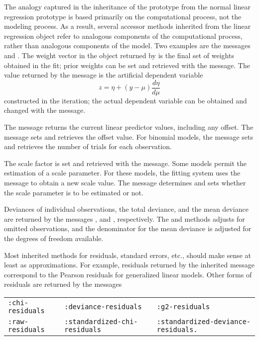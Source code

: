 The analogy captured in the inheritance of the 
prototype from the normal linear regression prototype is based
primarily on the computational process, not the modeling process. As a
result, several accessor methods inherited from the linear regression
object refer to analogous components of the computational process,
rather than analogous components of the model. Two examples are the
messages  and . The weight vector in the
object returned by  is the final set of weights
obtained in the fit; prior weights can be set and retrieved with the
 message. The value returned by the 
message is the artificial dependent variable
\begin{displaymath}
z = \eta + (y - \mu) \frac{d\eta}{d\mu}
\end{displaymath}
constructed in the iteration; the actual dependent variable can be
obtained and changed with the  message.

The message  returns the current linear predictor values,
including any offset. The  message sets and retrieves
the offset value. For binomial models, the  message
sets and retrieves the number of trials for each observation.

The scale factor is set and retrieved with the  message.
Some models permit the estimation of a scale parameter. For these
models, the fitting system uses the  message to
obtain a new scale value. The message 
determines and sets whether the scale parameter is to be estimated or
not.

Deviances of individual observations, the total deviance, and the mean
deviance are returned by the messages ,
 and , respectively. The
 and  methods adjusts for
omitted observations, and the denominator for the mean deviance is
adjusted for the degrees of freedom available.

Most inherited methods for residuals, standard errors, etc., should
make sense at least as approximations. For example, residuals returned
by the inherited  message correspond to the Pearson
residuals for generalized linear models. Other forms of residuals are
returned by the messages
\begin{center}
\begin{tabular}{lll}
\tt :chi-residuals & \tt :deviance-residuals & \tt :g2-residuals\\
\tt :raw-residuals & \tt :standardized-chi-residuals & \tt :standardized-deviance-residuals.
\end{tabular}
\end{center}

